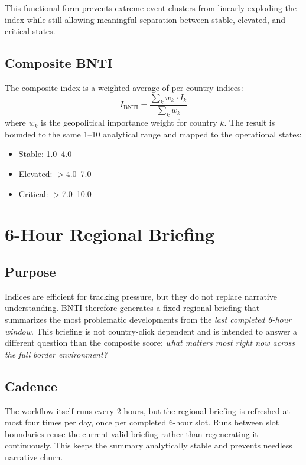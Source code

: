 \documentclass[11pt, a4paper]{article}
\begin{document}
This functional form prevents extreme event clusters from linearly exploding the index while still allowing meaningful separation between stable, elevated, and critical states.

\subsection{Composite BNTI}
The composite index is a weighted average of per-country indices:
\begin{equation}
    I_{\text{BNTI}} = \frac{\sum_k w_k \cdot I_k}{\sum_k w_k}
\end{equation}
where $w_k$ is the geopolitical importance weight for country $k$. The result is bounded to the same 1--10 analytical range and mapped to the operational states:
\begin{itemize}
    \item Stable: 1.0--4.0
    \item Elevated: $>$4.0--7.0
    \item Critical: $>$7.0--10.0
\end{itemize}

\section{6-Hour Regional Briefing}

\subsection{Purpose}
Indices are efficient for tracking pressure, but they do not replace narrative understanding. BNTI therefore generates a fixed regional briefing that summarizes the most problematic developments from the \emph{last completed 6-hour window}. This briefing is not country-click dependent and is intended to answer a different question than the composite score: \emph{what matters most right now across the full border environment?}

\subsection{Cadence}
The workflow itself runs every 2 hours, but the regional briefing is refreshed at most four times per day, once per completed 6-hour slot. Runs between slot boundaries reuse the current valid briefing rather than regenerating it continuously. This keeps the summary analytically stable and prevents needless narrative churn.
\end{document}
